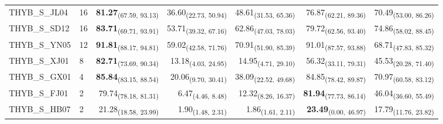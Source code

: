\begin{table}[p]
\begin{tabular}{llrrrrr}
THYB\_S\_JL04 & 16 & \textbf{81.27}\textsubscript{(67.59, 93.13)} & 36.60\textsubscript{(22.73, 50.94)} & 48.61\textsubscript{(31.53, 65.36)} & 76.87\textsubscript{(62.21, 89.36)} & 70.49\textsubscript{(53.00, 86.26)} \\
THYB\_S\_SD12 & 16 & \textbf{83.71}\textsubscript{(69.71, 93.91)} & 53.71\textsubscript{(39.32, 67.16)} & 62.86\textsubscript{(47.03, 78.03)} & 79.72\textsubscript{(62.56, 93.40)} & 74.86\textsubscript{(58.02, 88.45)} \\
THYB\_S\_YN05 & 12 & \textbf{91.81}\textsubscript{(88.17, 94.81)} & 59.02\textsubscript{(42.58, 71.76)} & 70.91\textsubscript{(51.90, 85.39)} & 91.01\textsubscript{(87.57, 93.88)} & 68.71\textsubscript{(47.83, 85.32)} \\
THYB\_S\_XJ01 & 8 & \textbf{82.71}\textsubscript{(73.69, 90.34)} & 13.18\textsubscript{(4.03, 24.95)} & 14.95\textsubscript{(4.71, 29.10)} & 56.32\textsubscript{(33.11, 79.31)} & 45.53\textsubscript{(20.28, 71.40)} \\
THYB\_S\_GX01 & 4 & \textbf{85.84}\textsubscript{(83.15, 88.54)} & 20.06\textsubscript{(9.70, 30.41)} & 38.09\textsubscript{(22.52, 49.68)} & 84.85\textsubscript{(78.42, 89.87)} & 70.97\textsubscript{(60.58, 83.12)} \\
THYB\_S\_FJ01 & 2 & 79.74\textsubscript{(78.18, 81.31)} & 6.47\textsubscript{(4.46, 8.48)} & 12.32\textsubscript{(8.26, 16.37)} & \textbf{81.94}\textsubscript{(77.73, 86.14)} & 46.04\textsubscript{(36.60, 55.49)} \\
THYB\_S\_HB07 & 2 & 21.28\textsubscript{(18.58, 23.99)} & 1.90\textsubscript{(1.48, 2.31)} & 1.86\textsubscript{(1.61, 2.11)} & \textbf{23.49}\textsubscript{(0.00, 46.97)} & 17.79\textsubscript{(11.76, 23.82)} \\
\bottomrule
\end{tabular}
\end{table}
\clearpage
